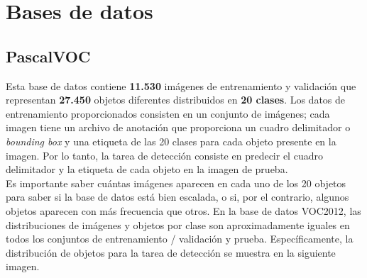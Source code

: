 \documentclass[a4paper, 12pt, oneside]{book}
\begin{document}
\begin{comment}
\textbf{LMDB} (Lightning Memory-Mapped Database) es una biblioteca de gestión de bases de datos modelada en la API de BerkeleyDB. Toda la base de datos está modelada como un mapa de memoria, y todos los datos recuperados de ella son datos devueltos directamente de la memoria asignada.\\

La biblioteca es totalmente compatible con subprocesos y admite el acceso simultáneo de lectura y escritura desde múltiples procesos o hilos. Las páginas de datos utilizan una estrategia que permite que no se sobreescriban las páginas con datos activos, lo cual brinda además resistencia a la corrupción de la base de datos. Las escrituras están totalmente serializadas, es decir, solo se permite una escritura de forma simultánea. La estructura de la base de datos tiene múltiples versiones para que las lecturas se ejecuten sin bloqueos; las escrituras sobre ésta no bloquean a las lecturas, y las lecturas no bloquean las escrituras.
\end{comment}

\section{Bases de datos}\label{BBDD}

\subsection{PascalVOC}\label{VOC}

Esta base de datos contiene \textbf{11.530} imágenes de entrenamiento y validación que representan \textbf{27.450} objetos diferentes distribuidos en \textbf{20 clases}. Los datos de entrenamiento proporcionados consisten en un conjunto de imágenes; cada imagen tiene un archivo de anotación que proporciona un cuadro delimitador o \textit{bounding box} y una etiqueta de las 20 clases para cada objeto presente en la imagen. Por lo tanto, la tarea de detección consiste en predecir el cuadro delimitador y la etiqueta de cada objeto en la imagen de prueba.\\

Es importante saber cuántas imágenes aparecen en cada uno de los 20 objetos para saber si la base de datos está bien escalada, o si, por el contrario, algunos objetos aparecen con más frecuencia que otros. En la base de datos VOC2012, las distribuciones de imágenes y objetos por clase son aproximadamente iguales en todos los conjuntos de entrenamiento / validación y prueba. Específicamente, la distribución de objetos para la tarea de detección se muestra en la siguiente imagen.
\end{document}
